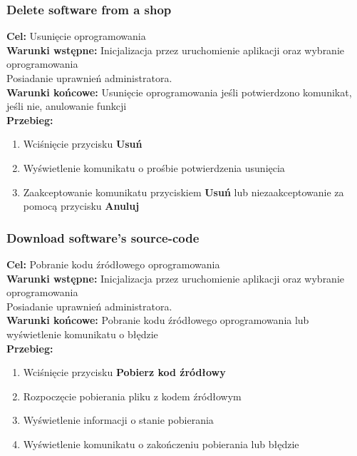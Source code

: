 \documentclass[12pt,a4paper]{article}
\begin{document}
\subsubsection{Delete software from a shop}
\textbf{Cel: } Usunięcie oprogramowania\\
\textbf{Warunki wstępne:} Inicjalizacja przez uruchomienie aplikacji oraz wybranie oprogramowania\\ Posiadanie uprawnień administratora.\\
\textbf{Warunki końcowe:} Usunięcie oprogramowania jeśli potwierdzono komunikat, jeśli nie, anulowanie funkcji\\
\textbf{Przebieg:}
\begin{enumerate}
    \item Wciśnięcie przycisku \textbf{Usuń}
    \item Wyświetlenie komunikatu o prośbie potwierdzenia usunięcia
    \item Zaakceptowanie komunikatu przyciskiem \textbf{Usuń} lub niezaakceptowanie za pomocą przycisku \textbf{Anuluj}
\end{enumerate}

\subsubsection{Download software's source-code}
\textbf{Cel: } Pobranie kodu źródłowego oprogramowania \\
\textbf{Warunki wstępne:} Inicjalizacja przez uruchomienie aplikacji oraz wybranie oprogramowania\\ Posiadanie uprawnień administratora.\\
\textbf{Warunki końcowe:} Pobranie kodu źródłowego oprogramowania lub wyświetlenie komunikatu o błędzie\\
\textbf{Przebieg:}
\begin{enumerate}
    \item Wciśnięcie przycisku \textbf{Pobierz kod źródłowy}
    \item Rozpoczęcie pobierania pliku z kodem źródłowym
    \item Wyświetlenie informacji o stanie pobierania
    \item Wyświetlenie komunikatu o zakończeniu pobierania lub błędzie
\end{enumerate}
\end{document}
